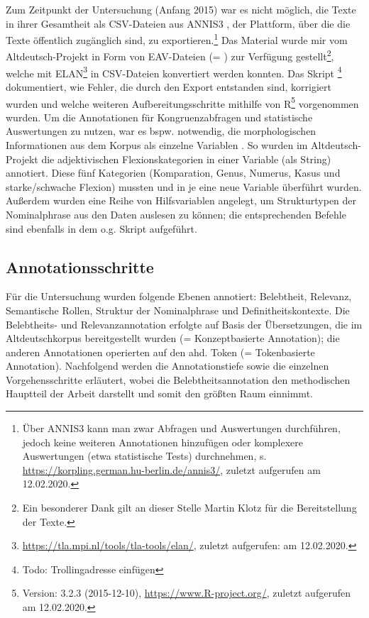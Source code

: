 Zum Zeitpunkt der Untersuchung (Anfang 2015) war es nicht möglich, die Texte in ihrer Gesamtheit als CSV-Dateien aus ANNIS3 \parencite{Krause2016}, der Plattform, über die die Texte öffentlich zugänglich sind, zu exportieren.\footnote{Über ANNIS3 kann man zwar Abfragen und Auswertungen durchführen, jedoch keine weiteren Annotationen hinzufügen oder komplexere Auswertungen (etwa statistische Tests) durchnehmen, s. \url{https://korpling.german.hu-berlin.de/annis3/}, zuletzt aufgerufen am 12.02.2020.} Das Material wurde mir vom Altdeutsch-Projekt in Form von EAV-Dateien (= ) zur Verfügung gestellt\footnote{Ein besonderer Dank gilt an dieser Stelle Martin Klotz für die Bereitstellung der Texte.}, welche mit ELAN\footnote{\url{https://tla.mpi.nl/tools/tla-tools/elan/}, zuletzt aufgerufen: am 12.02.2020.} in CSV-Dateien konvertiert werden konnten. 
Das Skript \footnote{Todo: Trollingadresse einfügen} dokumentiert, wie Fehler, die durch den Export entstanden sind, korrigiert wurden und welche weiteren Aufbereitungsschritte mithilfe von R\footnote{Version: 3.2.3 (2015-12-10), \url{https://www.R-project.org/}, zuletzt aufgerufen am 12.02.2020.} vorgenommen wurden. 
Um die Annotationen für Kongruenzabfragen und statistische Auswertungen zu nutzen, war es bspw. notwendig, die morphologischen Informationen aus dem Korpus als einzelne Variablen . So wurden im Altdeutsch-Projekt die adjektivischen Flexionskategorien in einer Variable (als String)  annotiert. Diese fünf Kategorien (Komparation, Genus, Numerus, Kasus und starke/schwache Flexion) mussten  und in je eine neue Variable überführt wurden. Außerdem wurden eine Reihe von Hilfsvariablen angelegt, um Strukturtypen der Nominalphrase aus den Daten auslesen zu können; die entsprechenden Befehle sind ebenfalls in dem o.g. Skript aufgeführt.  

\subsection{Annotationsschritte}\label{sec:annotationsschritte}

Für die Untersuchung wurden folgende Ebenen annotiert: Belebtheit, Relevanz, Semantische Rollen, Struktur der Nominalphrase und Definitheitskontexte. Die Belebtheits- und Relevanzannotation erfolgte auf Basis der Übersetzungen, die im Altdeutschkorpus bereitgestellt wurden (= Konzeptbasierte Annotation); die anderen Annotationen operierten auf den ahd. Token  (= Tokenbasierte Annotation). Nachfolgend werden die Annotationstiefe sowie die einzelnen Vorgehensschritte erläutert, wobei die Belebtheitsannotation den methodischen Hauptteil der Arbeit darstellt und somit den größten Raum einnimmt.

